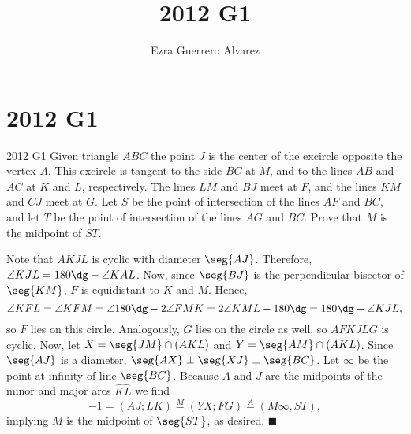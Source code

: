 \documentclass[14pt]{article}
\title{2012 G1}
\author{Ezra Guerrero Alvarez}
\begin{document}
\maketitle
	
\section*{2012 G1}

\begin{statement}{2012 G1}
	Given triangle $ABC$ the point $J$ is the center of the excircle opposite the vertex $A$. This excircle is tangent to the side $BC$ at $M$, and to the lines $AB$ and $AC$ at $K$ and $L$, respectively. The lines $LM$ and $BJ$ meet at $F$, and the lines $KM$ and $CJ$ meet at $G$. Let $S$ be the point of intersection of the lines $AF$ and $BC$, and let $T$ be the point of intersection of the lines $AG$ and $BC$. Prove that $M$ is the midpoint of $ST$.
\end{statement}
Note that $AKJL$ is cyclic with diameter $\seg{AJ}$. Therefore, $\angle KJL=180\dg-\angle KAL$. Now, since $\seg{BJ}$ is the perpendicular bisector of $\seg{KM}$, $F$ is equidistant to $K$ and $M$. Hence,
\[ \angle KFL = \angle KFM = \angle 180\dg-2\angle FMK = 2\angle KML - 180\dg = 180\dg-\angle KJL, \]
so $F$ lies on this circle. Analogously, $G$ lies on the circle as well, so $AFKJLG$ is cyclic. Now, let $X=\seg{JM}\cap(AKL)$ and $Y=\seg{AM}\cap(AKL)$. Since $\seg{AJ}$ is a diameter, $\seg{AX}\perp\seg{XJ}\perp\seg{BC}$. Let $\infty$ be the point at infinity of line $\seg{BC}$. Because $A$ and $J$ are the midpoints of the minor and major arcs $\widehat{KL}$ we find
\[ -1=(AJ;LK)\stackrel M=(YX;FG)\stackrel A=(M\infty,ST), \]
implying $M$ is the midpoint of $\seg{ST}$, as desired. $\blacksquare$
	
\end{document}

